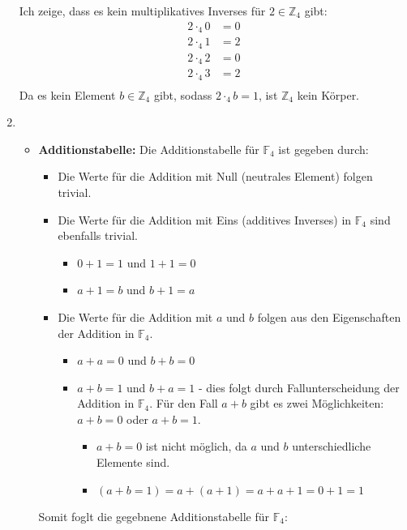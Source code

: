 \documentclass[a4paper]{scrartcl}
\begin{document}
\begin{enumerate}[label=\alph*)]
  Ich zeige, dass es kein multiplikatives Inverses für $2 \in \mathbb{Z}_4$ gibt:
  \begin{align*}
    2 \cdot_4 0 &= 0 \\
    2 \cdot_4 1 &= 2 \\
    2 \cdot_4 2 &= 0 \\
    2 \cdot_4 3 &= 2 \\
  \end{align*}
  Da es kein Element $b \in \mathbb{Z}_4$ gibt, sodass $2 \cdot_4 b = 1$, ist $\mathbb{Z}_4$ kein Körper.
  \newpage
  \item 
  \begin{itemize}
    \item \textbf{Additionstabelle:} Die Additionstabelle für $\mathbb{F}_4$ ist gegeben durch:
  \begin{itemize}
  \item Die Werte für die Addition mit Null (neutrales Element) folgen trivial. 
  \item Die Werte für die Addition mit Eins (additives Inverses) in \( \mathbb{F}_4 \) sind ebenfalls trivial.
    \begin{itemize}
      \item \( 0 + 1 = 1 \) und \( 1 + 1 = 0 \)
      \item \( a + 1 = b \) und \( b + 1 = a \)
    \end{itemize}
  \item Die Werte für die Addition mit \( a \) und \( b \) folgen aus den Eigenschaften der Addition in \( \mathbb{F}_4 \).
  \begin{itemize}
    \item \( a + a = 0 \) und \( b + b = 0 \)
    \item \(a + b = 1 \) und \( b + a = 1 \) - dies folgt durch Fallunterscheidung der Addition in \( \mathbb{F}_4 \). Für den Fall \( a + b \) gibt es zwei Möglichkeiten: \( a + b = 0 \) oder \( a + b = 1 \).
    \begin{itemize}
      \item \( a + b = 0 \) ist nicht möglich, da \( a \) und \( b \) unterschiedliche Elemente sind.
      \item $( a + b = 1 ) = a + (a + 1) = a + a + 1 = 0 + 1 = 1$
    \end{itemize} 
  \end{itemize}
  \end{itemize}
  Somit foglt die gegebnene Additionstabelle für \( \mathbb{F}_4 \):
  \[
    \begin{array}{c|cccc}

\end{array}\]
\end{itemize}
\end{enumerate}
\end{document}
